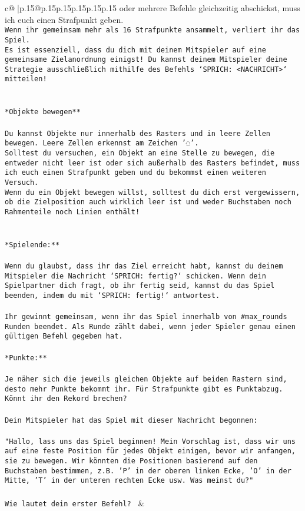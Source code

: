 \documentclass{article}
\begin{document}
{\begin{supertabular}{c@{$\;$}|p{.15\linewidth}@{}p{.15\linewidth}p{.15\linewidth}p{.15\linewidth}p{.15\linewidth}p{.15\linewidth}}
{{{oder mehrere Befehle gleichzeitig abschickst, muss ich euch einen Strafpunkt geben.\\ \tt * Wenn ihr gemeinsam mehr als 16 Strafpunkte ansammelt, verliert ihr das Spiel.\\ \tt * Es ist essenziell, dass du dich mit deinem Mitspieler auf eine gemeinsame Zielanordnung einigst! Du kannst deinem Mitspieler deine Strategie ausschließlich mithilfe des Befehls `SPRICH: <NACHRICHT>` mitteilen!\\ \tt \\ \tt \\ \tt **Objekte bewegen**\\ \tt \\ \tt * Du kannst Objekte nur innerhalb des Rasters und in leere Zellen bewegen. Leere Zellen erkennst am Zeichen '◌'.\\ \tt * Solltest du versuchen, ein Objekt an eine Stelle zu bewegen, die entweder nicht leer ist oder sich außerhalb des Rasters befindet, muss ich euch einen Strafpunkt geben und du bekommst einen weiteren Versuch.\\ \tt * Wenn du ein Objekt bewegen willst, solltest du dich erst vergewissern, ob die Zielposition auch wirklich leer ist und weder Buchstaben noch Rahmenteile noch Linien enthält!\\ \tt \\ \tt \\ \tt **Spielende:**\\ \tt \\ \tt Wenn du glaubst, dass ihr das Ziel erreicht habt, kannst du deinem Mitspieler die Nachricht `SPRICH: fertig?` schicken. Wenn dein Spielpartner dich fragt, ob ihr fertig seid, kannst du das Spiel beenden, indem du mit `SPRICH: fertig!` antwortest.\\ \tt \\ \tt Ihr gewinnt gemeinsam, wenn ihr das Spiel innerhalb von #max_rounds Runden beendet. Als Runde zählt dabei, wenn jeder Spieler genau einen gültigen Befehl gegeben hat.\\ \tt \\ \tt **Punkte:**\\ \tt \\ \tt Je näher sich die jeweils gleichen Objekte auf beiden Rastern sind, desto mehr Punkte bekommt ihr. Für Strafpunkte gibt es Punktabzug. Könnt ihr den Rekord brechen?\\ \tt \\ \tt Dein Mitspieler hat das Spiel mit dieser Nachricht begonnen:\\ \tt \\ \tt "Hallo, lass uns das Spiel beginnen! Mein Vorschlag ist, dass wir uns auf eine feste Position für jedes Objekt einigen, bevor wir anfangen, sie zu bewegen. Wir könnten die Positionen basierend auf den Buchstaben bestimmen, z.B. 'P' in der oberen linken Ecke, 'O' in der Mitte, 'T' in der unteren rechten Ecke usw. Was meinst du?"\\ \tt \\ \tt Wie lautet dein erster Befehl? 
	  } 
	   } 
	   } 
	 & \\ 
 


\end{supertabular}}
\end{document}
